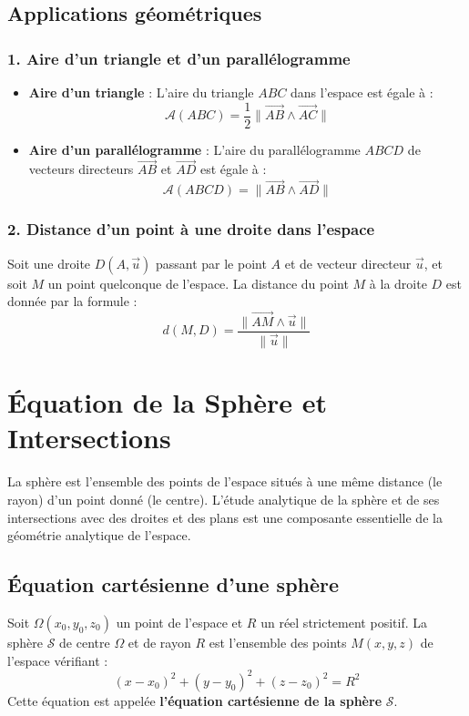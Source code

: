 \subsection{Applications géométriques}

\subsubsection{1. Aire d'un triangle et d'un parallélogramme}
\begin{itemize}
    \item \textbf{Aire d'un triangle} : L'aire du triangle $ABC$ dans l'espace est égale à :
    \[
    \mathcal{A}(ABC) = \frac{1}{2} \|\vec{AB} \wedge \vec{AC}\|
    \]
    \item \textbf{Aire d'un parallélogramme} : L'aire du parallélogramme $ABCD$ de vecteurs directeurs $\vec{AB}$ et $\vec{AD}$ est égale à :
    \[
    \mathcal{A}(ABCD) = \|\vec{AB} \wedge \vec{AD}\|
    \]
\end{itemize}

\subsubsection{2. Distance d'un point à une droite dans l'espace}
Soit une droite $D(A, \vec{u})$ passant par le point $A$ et de vecteur directeur $\vec{u}$, et soit $M$ un point quelconque de l'espace.
La distance du point $M$ à la droite $D$ est donnée par la formule :
\[
d(M, D) = \frac{\|\vec{AM} \wedge \vec{u}\|}{\|\vec{u}\|}
\]

\section{Équation de la Sphère et Intersections}

La sphère est l'ensemble des points de l'espace situés à une même distance (le rayon) d'un point donné (le centre). L'étude analytique de la sphère et de ses intersections avec des droites et des plans est une composante essentielle de la géométrie analytique de l'espace.

\subsection{Équation cartésienne d'une sphère}

\begin{theoreme}
Soit $\Omega(x_0, y_0, z_0)$ un point de l'espace et $R$ un réel strictement positif.
La sphère $\mathcal{S}$ de centre $\Omega$ et de rayon $R$ est l'ensemble des points $M(x, y, z)$ de l'espace vérifiant :
\[
(x - x_0)^2 + (y - y_0)^2 + (z - z_0)^2 = R^2
\]
Cette équation est appelée \textbf{l'équation cartésienne de la sphère} $\mathcal{S}$.
\end{theoreme}

